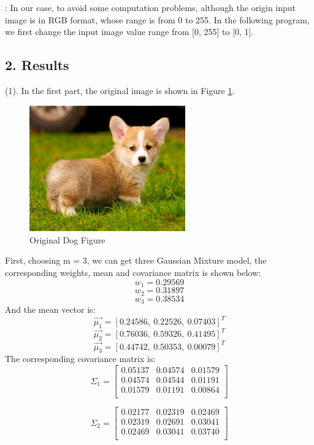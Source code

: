 : In our case, to avoid some computation problems, although the origin input image is in RGB format, whose range is from 0 to 255. In the following program, we first change the input image value range from [0, 255] to [0, 1].

\subsection*{\large 2. Results}

(1). In the first part, the original image is shown in Figure \ref{fig:corgi}.
\begin{figure}[H]
\centering
\includegraphics[width=0.6\textwidth]{./figures/corgi.png}
\caption{\label{fig:corgi} Original Dog Figure}
\end{figure}

First, choosing m = 3, we can get three Gaussian Mixture model, the corresponding weights, mean and covariance matrix is shown below:
$$ w_1 = 0.29569 $$
$$ w_2 = 0.31897 $$
$$ w_3 = 0.38534 $$
And the mean vector is:
$$ \vec{\mu_1} = [0.24586, \  0.22526, \  0.07403]^T$$
$$ \vec{\mu_2} = [0.76036, \  0.59326, \  0.41495]^T$$
$$ \vec{\mu_3} = [0.44742, \  0.50353, \  0.00079]^T$$
The corresponding covariance matrix is:
$$\Sigma_1 =
\begin{bmatrix}
	0.05137	&	0.04574	&	0.01579 \\ 
	0.04574	&	0.04544	&	0.01191 \\
	0.01579	&	0.01191	&	0.00864	\\
\end{bmatrix}$$

$$\Sigma_2 =
\begin{bmatrix}
	0.02177	&	0.02319	&	0.02469 \\ 
	0.02319	&	0.02691	&	0.03041 \\
	0.02469	&	0.03041	&	0.03740	\\
\end{bmatrix}$$

